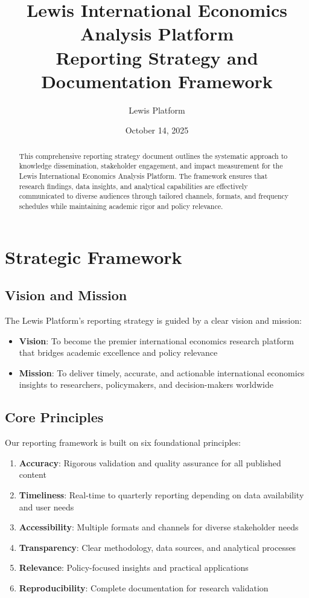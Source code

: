 \documentclass[11pt,a4paper]{article}
\title{\textbf{Lewis International Economics Analysis Platform} \\
\large Reporting Strategy and Documentation Framework}
\author{Lewis Platform}
\date{October 14, 2025}
\begin{document}
\maketitle

\begin{abstract}
This comprehensive reporting strategy document outlines the systematic approach to knowledge dissemination, stakeholder engagement, and impact measurement for the Lewis International Economics Analysis Platform. The framework ensures that research findings, data insights, and analytical capabilities are effectively communicated to diverse audiences through tailored channels, formats, and frequency schedules while maintaining academic rigor and policy relevance.
\end{abstract}

\tableofcontents
\newpage

\section{Strategic Framework}

\subsection{Vision and Mission}
The Lewis Platform's reporting strategy is guided by a clear vision and mission:

\begin{itemize}
    \item \textbf{Vision}: To become the premier international economics research platform that bridges academic excellence and policy relevance
    \item \textbf{Mission}: To deliver timely, accurate, and actionable international economics insights to researchers, policymakers, and decision-makers worldwide
\end{itemize}

\subsection{Core Principles}
Our reporting framework is built on six foundational principles:

\begin{enumerate}
    \item \textbf{Accuracy}: Rigorous validation and quality assurance for all published content
    \item \textbf{Timeliness}: Real-time to quarterly reporting depending on data availability and user needs
    \item \textbf{Accessibility}: Multiple formats and channels for diverse stakeholder needs
    \item \textbf{Transparency}: Clear methodology, data sources, and analytical processes
    \item \textbf{Relevance}: Policy-focused insights and practical applications
    \item \textbf{Reproducibility}: Complete documentation for research validation
\end{enumerate}
\end{document}
